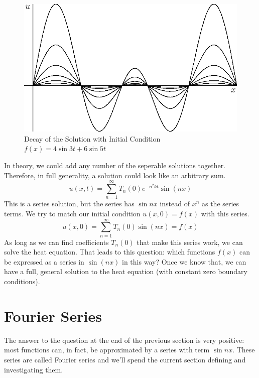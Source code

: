 \documentclass[fleqn,letterpaper]{report}
\begin{document}
\begin{figure}[t]
\centering
\includegraphics[width=12cm]{figure42.eps}
\caption{Decay of the Solution with Initial Condition $f(x) =
4 \sin 3t + 6 \sin 5t$}
\label{figure-seperable-solution2}
\end{figure}

In theory, we could add any number of the seperable solutions
together. Therefore, in full generality, a solution could
look like an arbitrary sum.
\begin{equation*}
u(x,t) = \sum_{n=1}^\infty T_n(0) e^{-n^2kt} \sin (nx) 
\end{equation*}
This is a series solution, but the series has $\sin nx$
instead of $x^n$ as the series terms. We try to match our
initial condition $u(x,0) = f(x)$ with this series.
\begin{equation*}
u(x,0) = \sum_{n=1}^\infty T_n(0) \sin (nx) = f(x) 
\end{equation*} 
As long as we can find coefficients $T_n(0)$ that make this
series work, we can solve the heat equation. That leads to
this question: which functions $f(x)$ can be expressed as a
series in $\sin (nx)$ in this way? Once we know that, we can
have a full, general solution to the heat equation (with
constant zero boundary conditions).

\section{Fourier Series}
\label{fourier-series}

The answer to the question at the end of the previous section
is very positive: most functions can, in fact, be approximated
by a series with term $\sin nx$. These series are called Fourier
series and we'll spend the current section defining and
investigating them.
\end{document}
